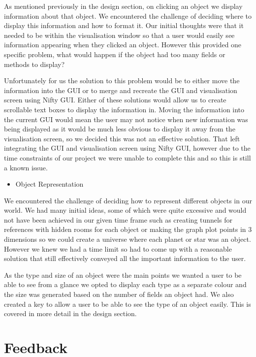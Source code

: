 \documentclass[11pt, a4paper]{report}
\begin{document}
As mentioned previously in the design section, on clicking an object we display information about that object. We encountered the challenge of deciding where to display this information and how to format it. Our initial thoughts were that it needed to be within the visualisation window so that a user would easily see information appearing when they clicked an object. However this provided one specific problem, what would happen if the object had too many fields or methods to display? 

Unfortunately for us the solution to this problem would be to either move the information into the GUI or to merge and recreate the GUI and visualisation screen using Nifty GUI. Either of these solutions would allow us to create scrollable text boxes to display the information in. Moving the information into the current GUI would mean the user may not notice when new information was being displayed as it would be much less obvious to display it away from the visualisation screen, so we decided this was not an effective solution. That left integrating the GUI and visualisation screen using Nifty GUI, however due to the time constraints of our project we were unable to complete this and so this is still a known issue.

\begin{itemize}
  \item Object Representation
\end{itemize}

We encountered the challenge of deciding how to represent different objects in our world. We had many initial ideas, some of which were quite excessive and would not have been achieved in our given time frame such as creating tunnels for references with hidden rooms for each object or making the graph plot points in 3 dimensions so we could create a universe where each planet or star was an object. However we knew we had a time limit so had to come up with a reasonable solution that still effectively conveyed all the important information to the user.

As the type and size of an object were the main points we wanted a user to be able to see from a glance we opted to display each type as a separate colour and the size was generated based on the number of fields an object had. We also created a key to allow a user to be able to see the type of an object easily. This is covered in more detail in the design section. 

\section{Feedback}
\end{document}
